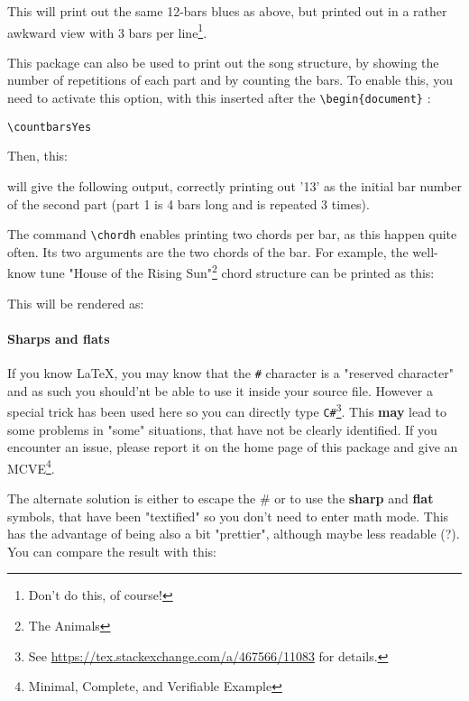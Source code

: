 \documentclass[11pt]{article}
\newcommand{\btt}{\bfseries \ttfamily }
\begin{document}
This will print out the same 12-bars blues as above, but printed out in a rather awkward view with 3 bars per line\footnote{Don't do this, of course!}.

\def\NumberOfBarsPerLine{3}


This package can also be used to print out the song structure, by showing the number of repetitions of each part and by counting the bars.
To enable this, you need to activate this option, with this inserted after the \verb!\begin{document}! :

\begin{lstlisting}
\countbarsYes
\end{lstlisting}

Then, this:


will give the following output, correctly printing out '13' as the initial bar number of the second part (part 1 is 4 bars long and is repeated 3 times).

\def\NumberOfBarsPerLine{4}
\resetchordbars
\countbarsYes


The command \verb|\chordh| enables printing two chords per bar, as this happen quite often.
Its two arguments are the two chords of the bar.
For example, the well-know tune "House of the Rising Sun"\footnote{The Animals} chord structure can be printed as this:



This will be rendered as:
\resetchordbars
\countbarsNo


\paragraph{Sharps and flats} If you know \LaTeX, you may know that the {\tt \#} character is a "reserved character" and as such you should'nt be able to use it inside your source file.
However a special trick has been used here so you can directly type {\tt C\#}\footnote{See \url{https://tex.stackexchange.com/a/467566/11083} for details.}.
This {\bf may} lead to some problems in "some" situations, that have not be clearly identified.
If you encounter an issue, please report it on the home page of this package and give an MCVE\footnote{Minimal, Complete, and Verifiable Example}.

The alternate solution is either to escape the \# or to use the {\btt sharp} and {\btt flat} symbols, that have been "textified" so you don't need to enter math mode.
This has the advantage of being also a bit "prettier", although maybe less readable (?).
You can compare the result with this:
\end{document}
